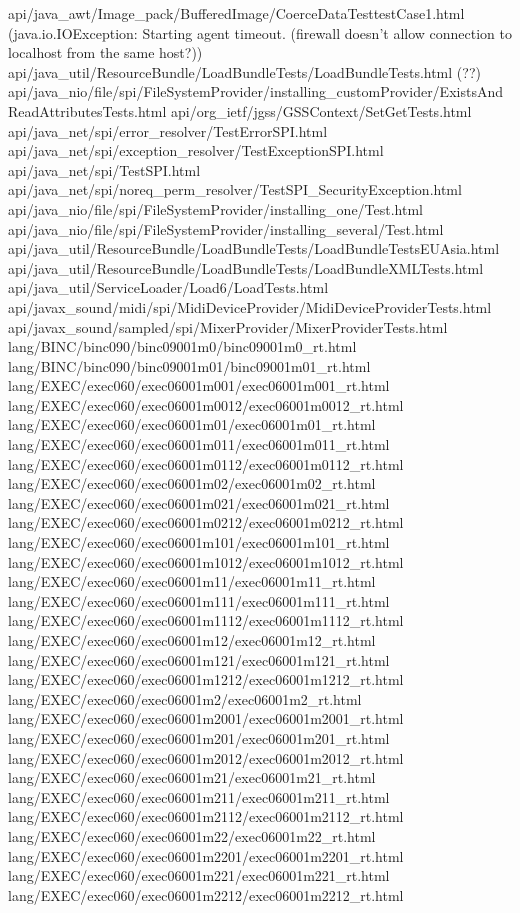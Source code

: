 api/java_awt/Image_pack/BufferedImage/CoerceDataTesttestCase1.html (java.io.IOException: Starting agent timeout. (firewall doesn't allow connection to localhost from the same host?))
api/java_util/ResourceBundle/LoadBundleTests/LoadBundleTests.html (??)
api/java_nio/file/spi/FileSystemProvider/installing_customProvider/ExistsAndReadAttributesTests.html
api/org_ietf/jgss/GSSContext/SetGetTests.html
api/java_net/spi/error_resolver/TestErrorSPI.html
api/java_net/spi/exception_resolver/TestExceptionSPI.html
api/java_net/spi/TestSPI.html
api/java_net/spi/noreq_perm_resolver/TestSPI_SecurityException.html
api/java_nio/file/spi/FileSystemProvider/installing_one/Test.html
api/java_nio/file/spi/FileSystemProvider/installing_several/Test.html
api/java_util/ResourceBundle/LoadBundleTests/LoadBundleTestsEUAsia.html
api/java_util/ResourceBundle/LoadBundleTests/LoadBundleXMLTests.html
api/java_util/ServiceLoader/Load6/LoadTests.html
api/javax_sound/midi/spi/MidiDeviceProvider/MidiDeviceProviderTests.html
api/javax_sound/sampled/spi/MixerProvider/MixerProviderTests.html
lang/BINC/binc090/binc09001m0/binc09001m0_rt.html
lang/BINC/binc090/binc09001m01/binc09001m01_rt.html
lang/EXEC/exec060/exec06001m001/exec06001m001_rt.html
lang/EXEC/exec060/exec06001m0012/exec06001m0012_rt.html
lang/EXEC/exec060/exec06001m01/exec06001m01_rt.html
lang/EXEC/exec060/exec06001m011/exec06001m011_rt.html
lang/EXEC/exec060/exec06001m0112/exec06001m0112_rt.html
lang/EXEC/exec060/exec06001m02/exec06001m02_rt.html
lang/EXEC/exec060/exec06001m021/exec06001m021_rt.html
lang/EXEC/exec060/exec06001m0212/exec06001m0212_rt.html
lang/EXEC/exec060/exec06001m101/exec06001m101_rt.html
lang/EXEC/exec060/exec06001m1012/exec06001m1012_rt.html
lang/EXEC/exec060/exec06001m11/exec06001m11_rt.html
lang/EXEC/exec060/exec06001m111/exec06001m111_rt.html
lang/EXEC/exec060/exec06001m1112/exec06001m1112_rt.html
lang/EXEC/exec060/exec06001m12/exec06001m12_rt.html
lang/EXEC/exec060/exec06001m121/exec06001m121_rt.html
lang/EXEC/exec060/exec06001m1212/exec06001m1212_rt.html
lang/EXEC/exec060/exec06001m2/exec06001m2_rt.html
lang/EXEC/exec060/exec06001m2001/exec06001m2001_rt.html
lang/EXEC/exec060/exec06001m201/exec06001m201_rt.html
lang/EXEC/exec060/exec06001m2012/exec06001m2012_rt.html
lang/EXEC/exec060/exec06001m21/exec06001m21_rt.html
lang/EXEC/exec060/exec06001m211/exec06001m211_rt.html
lang/EXEC/exec060/exec06001m2112/exec06001m2112_rt.html
lang/EXEC/exec060/exec06001m22/exec06001m22_rt.html
lang/EXEC/exec060/exec06001m2201/exec06001m2201_rt.html
lang/EXEC/exec060/exec06001m221/exec06001m221_rt.html
lang/EXEC/exec060/exec06001m2212/exec06001m2212_rt.html
